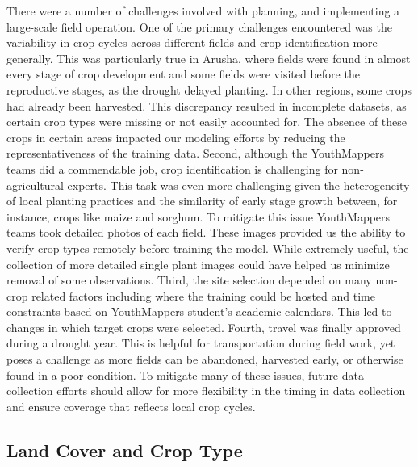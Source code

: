 \documentclass[
  journal,
  twocolumn]{IEEEtran}
\begin{document}
There were a number of challenges involved with planning, and
implementing a large-scale field operation. One of the primary
challenges encountered was the variability in crop cycles across
different fields and crop identification more generally. This was
particularly true in Arusha, where fields were found in almost every
stage of crop development and some fields were visited before the
reproductive stages, as the drought delayed planting. In other regions,
some crops had already been harvested. This discrepancy resulted in
incomplete datasets, as certain crop types were missing or not easily
accounted for. The absence of these crops in certain areas impacted our
modeling efforts by reducing the representativeness of the training
data. Second, although the YouthMappers teams did a commendable job,
crop identification is challenging for non-agricultural experts. This
task was even more challenging given the heterogeneity of local planting
practices and the similarity of early stage growth between, for
instance, crops like maize and sorghum. To mitigate this issue
YouthMappers teams took detailed photos of each field. These images
provided us the ability to verify crop types remotely before training
the model. While extremely useful, the collection of more detailed
single plant images could have helped us minimize removal of some
observations. Third, the site selection depended on many non-crop
related factors including where the training could be hosted and time
constraints based on YouthMappers student's academic calendars. This led
to changes in which target crops were selected. Fourth, travel was
finally approved during a drought year. This is helpful for
transportation during field work, yet poses a challenge as more fields
can be abandoned, harvested early, or otherwise found in a poor
condition. To mitigate many of these issues, future data collection
efforts should allow for more flexibility in the timing in data
collection and ensure coverage that reflects local crop cycles.

\hypertarget{land-cover-and-crop-type}{%
\subsection{Land Cover and Crop Type}\label{land-cover-and-crop-type}}
\end{document}

